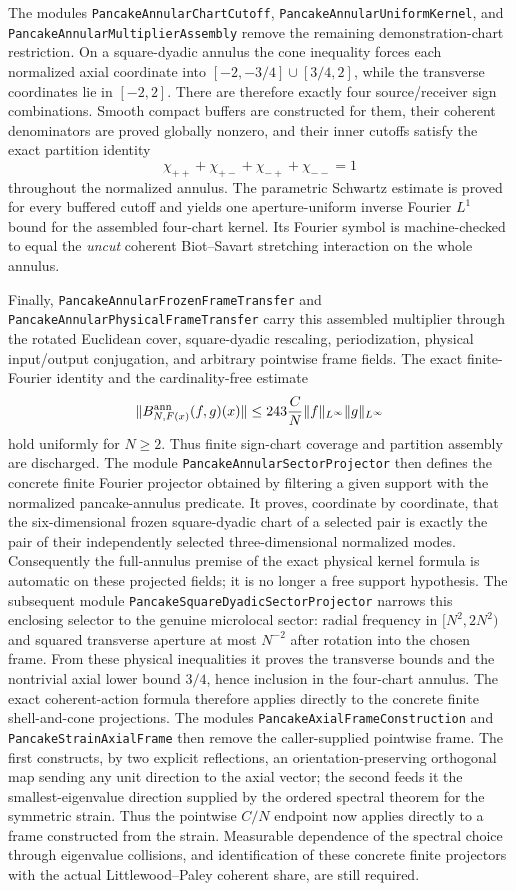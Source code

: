 \documentclass[11pt]{article}
\theoremstyle{definition}
\begin{document}
The modules \texttt{PancakeAnnularChartCutoff},
\texttt{PancakeAnnularUniformKernel}, and
\texttt{PancakeAnnularMultiplierAssembly} remove the remaining
demonstration-chart restriction.  On a square-dyadic annulus the cone
inequality forces each normalized axial coordinate into
$[-2,-3/4]\cup[3/4,2]$, while the transverse coordinates lie in $[-2,2]$.
There are therefore exactly four source/receiver sign combinations.  Smooth
compact buffers are constructed for them, their coherent denominators are
proved globally nonzero, and their inner cutoffs satisfy the exact partition
identity
\[
 \chi_{++}+\chi_{+-}+\chi_{-+}+\chi_{--}=1
\]
throughout the normalized annulus.  The parametric Schwartz estimate is
proved for every buffered cutoff and yields one aperture-uniform inverse
Fourier $L^1$ bound for the assembled four-chart kernel.  Its Fourier symbol
is machine-checked to equal the \emph{uncut} coherent Biot--Savart stretching
interaction on the whole annulus.

Finally, \texttt{PancakeAnnularFrozenFrameTransfer} and
\texttt{PancakeAnnularPhysicalFrameTransfer} carry this assembled multiplier
through the rotated Euclidean cover, square-dyadic rescaling, periodization,
physical input/output conjugation, and arbitrary pointwise frame fields.  The
exact finite-Fourier identity and the cardinality-free estimate
\[
 \|B^{\rm ann}_{N,F(x)}(f,g)(x)\|
 \le 243\frac{C}{N}\|f\|_{L^\infty}\|g\|_{L^\infty}
\]
hold uniformly for $N\ge2$.  Thus finite sign-chart coverage and partition
assembly are discharged.  The module
\texttt{PancakeAnnularSectorProjector} then defines the concrete finite
Fourier projector obtained by filtering a given support with the normalized
pancake-annulus predicate.  It proves, coordinate by coordinate, that the
six-dimensional frozen square-dyadic chart of a selected pair is exactly the
pair of their independently selected three-dimensional normalized modes.
Consequently the full-annulus premise of the exact physical kernel formula is
automatic on these projected fields; it is no longer a free support
hypothesis.  The subsequent module
\texttt{PancakeSquareDyadicSectorProjector} narrows this enclosing selector to
the genuine microlocal sector: radial frequency in $[N^2,2N^2)$ and squared
transverse aperture at most $N^{-2}$ after rotation into the chosen frame.
From these physical inequalities it proves the transverse bounds and the
nontrivial axial lower bound $3/4$, hence inclusion in the four-chart annulus.
The exact coherent-action formula therefore applies directly to the concrete
finite shell-and-cone projections.  The modules
\texttt{PancakeAxialFrameConstruction} and
\texttt{PancakeStrainAxialFrame} then remove the caller-supplied pointwise
frame.  The first constructs, by two explicit reflections, an
orientation-preserving orthogonal map sending any unit direction to the axial
vector; the second feeds it the smallest-eigenvalue direction supplied by the
ordered spectral theorem for the symmetric strain.  Thus the pointwise
$C/N$ endpoint now applies directly to a frame constructed from the strain.
Measurable dependence of the spectral choice through eigenvalue collisions,
and identification of these concrete finite projectors with the actual
Littlewood--Paley coherent share, are still required.
\end{document}
